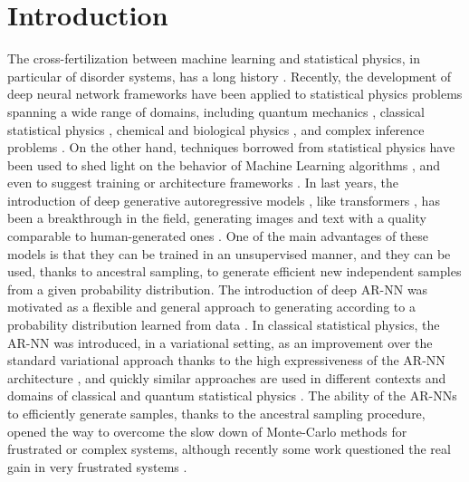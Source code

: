 \documentclass[aps,physrev,10pt,floatfix,reprint]{revtex4-2}
\begin{document}
    
\maketitle
\tableofcontents
\section{Introduction} 
The cross-fertilization between machine learning and statistical physics, in particular of disorder systems, has a long history \cite{doi:10.1073/pnas.79.8.2554, PhysRevA.32.1007}.
Recently, the development of deep neural network frameworks \cite{bengioNatureDeepLearning2015} have been applied to statistical physics problems \cite{RevModPhys.91.045002} spanning a wide range of domains, including quantum mechanics \cite{doi:10.1126/science.aag2302, Nieuwenburg2017}, 
classical statistical physics \cite{Carrasquilla2017, Wu2019}, chemical and biological physics \cite{noe2019boltzmann,jumper2021highly}, and complex inference problems \cite{Biazzo2022}.
On the other hand, techniques borrowed from statistical physics have been used to shed light on the behavior of Machine Learning algorithms \cite{doi:10.1080/00018732.2016.1211393, Nguyen2017}, and even to suggest training or architecture frameworks \cite{Chaudhari_2019, pmlr-v37-sohl-dickstein15}.
In last years, the introduction of deep generative autoregressive models \cite{pmlr-v37-germain15, NIPS2016_b1301141}, like transformers \cite{NIPS2017_3f5ee243}, has been a breakthrough in the field, generating images and text with a quality comparable to human-generated ones \cite{https://doi.org/10.48550/arxiv.2005.14165}. One of the main advantages of these models is that they can be trained in an unsupervised manner, and they can be used, thanks to ancestral sampling, to generate efficient new independent samples from a given probability distribution. 
The introduction of deep AR-NN was motivated as a flexible and general approach to generating according to a probability distribution learned from data \cite{pmlr-v32-gregor14, pmlr-v15-larochelle11a, pmlr-v48-oord16}. In classical statistical physics, the AR-NN was introduced, in a variational setting, as an improvement over the standard variational approach thanks to the high expressiveness of the AR-NN architecture \cite{Wu2019}, and quickly similar approaches are used in different contexts and domains of classical \cite{10.1103/physreve.101.023304,PhysRevE.101.053312,PhysRevE.103.012103,PhysRevResearch.3.L042024,10.1038/s42256-021-00401-3} and quantum statistical physics \cite{10.1103/physrevlett.128.090501,PhysRevA.102.062413,PhysRevLett.124.020503,PhysRevResearch.2.023358, Liu_2021, Barrett2022}. The ability of the AR-NNs to efficiently generate samples, thanks to the ancestral sampling procedure, opened the way to overcome the slow down of Monte-Carlo methods for frustrated or complex systems, although recently some work questioned the real gain in very frustrated systems \cite{condmat7020038,https://doi.org/10.48550/arxiv.2210.11145}.
\end{document}
